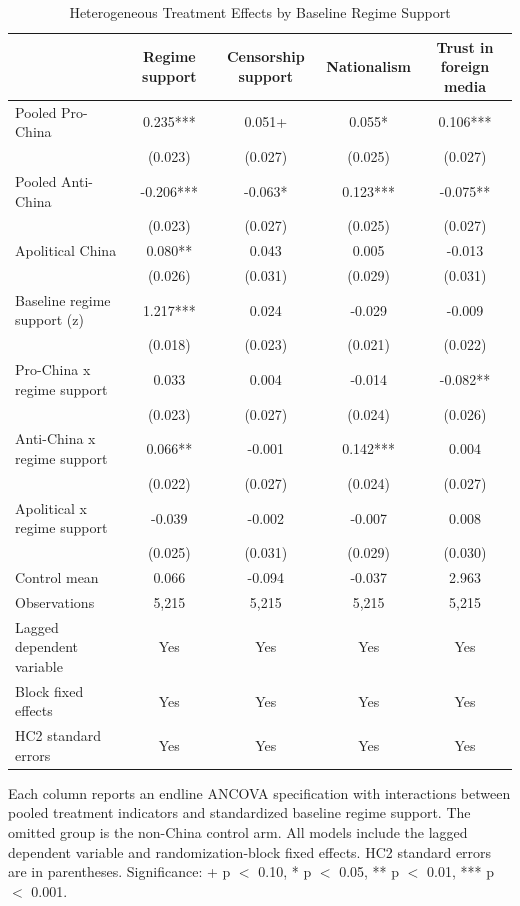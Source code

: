 \begin{table}[H]
\centering
\caption{Heterogeneous Treatment Effects by Baseline Regime Support}
\label{tab:het_rs_t1}
\footnotesize
\begin{threeparttable}
\begin{tabular}{lcccc}
\toprule
 & Regime support & Censorship support & Nationalism & Trust in foreign media \\
\midrule
Pooled Pro-China & 0.235*** & 0.051+ & 0.055* & 0.106*** \\
 & (0.023) & (0.027) & (0.025) & (0.027) \\
\addlinespace
Pooled Anti-China & -0.206*** & -0.063* & 0.123*** & -0.075** \\
 & (0.023) & (0.027) & (0.025) & (0.027) \\
\addlinespace
Apolitical China & 0.080** & 0.043 & 0.005 & -0.013 \\
 & (0.026) & (0.031) & (0.029) & (0.031) \\
\addlinespace
Baseline regime support (z) & 1.217*** & 0.024 & -0.029 & -0.009 \\
 & (0.018) & (0.023) & (0.021) & (0.022) \\
\addlinespace
Pro-China x regime support & 0.033 & 0.004 & -0.014 & -0.082** \\
 & (0.023) & (0.027) & (0.024) & (0.026) \\
\addlinespace
Anti-China x regime support & 0.066** & -0.001 & 0.142*** & 0.004 \\
 & (0.022) & (0.027) & (0.024) & (0.027) \\
\addlinespace
Apolitical x regime support & -0.039 & -0.002 & -0.007 & 0.008 \\
 & (0.025) & (0.031) & (0.029) & (0.030) \\
\addlinespace
\midrule
Control mean & 0.066 & -0.094 & -0.037 & 2.963 \\
Observations & 5,215 & 5,215 & 5,215 & 5,215 \\
Lagged dependent variable & Yes & Yes & Yes & Yes \\
Block fixed effects & Yes & Yes & Yes & Yes \\
HC2 standard errors & Yes & Yes & Yes & Yes \\
\bottomrule
\end{tabular}
\begin{tablenotes}[flushleft]
\footnotesize
\item Each column reports an endline ANCOVA specification with interactions between pooled treatment indicators and standardized baseline regime support. The omitted group is the non-China control arm. All models include the lagged dependent variable and randomization-block fixed effects. HC2 standard errors are in parentheses. Significance: + p $<$ 0.10, * p $<$ 0.05, ** p $<$ 0.01, *** p $<$ 0.001.
\end{tablenotes}
\end{threeparttable}
\end{table}
